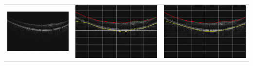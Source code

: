 \documentclass[12pt,a4paper]{scrartcl}
\begin{document}
\begin{table}[H]
\begin{tabular}{ | m{5cm} | m{5cm} | m{5cm} | }
\begin{minipage}{.3\textwidth}
    \end{minipage}
    \\ \hline%
    \begin{minipage}{.3\textwidth}
      \includegraphics[width=\linewidth]{./images/TableOCT/base3.jpeg}
    \end{minipage}
    &
     \begin{minipage}{.3\textwidth}
      \includegraphics[width=\linewidth]{./images/TableOCT/ILM_BM_3.png}
    \end{minipage}
    & 
     \begin{minipage}{.3\textwidth}
      \includegraphics[width=\linewidth]{./images/TableOCT/ILM_BM_3_5_25.png}

\end{minipage}
\end{tabular}
\end{table}
\end{document}

